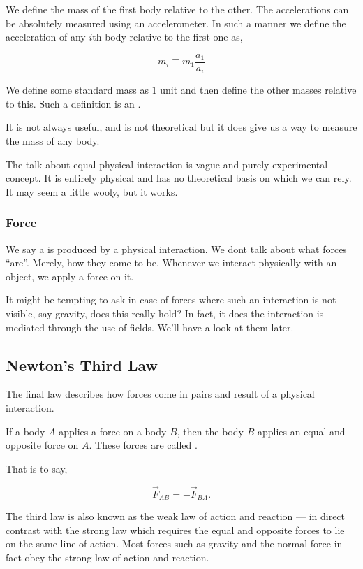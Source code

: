 We define the mass of the first body relative to the other. The accelerations
can be absolutely measured using an accelerometer. In such a manner we define 
the acceleration of any \(i\)th body relative to the first one as, 

\[m_i \equiv m_1\frac{a_1}{a_i}\]

We define some standard mass as \(1\) unit and then define the other masses 
relative to this. Such a definition is an .

It is not always useful, and is not theoretical but it does give us a way to measure the mass
of any body. 

The talk about equal physical interaction is vague and purely experimental concept.
It is entirely physical and has no theoretical basis on which we can rely. It
may seem a little wooly, but it works.

\subsubsection{Force}

We say a  is produced by a physical interaction. We dont 
talk about what forces ``are''. Merely, how they come to be. Whenever 
we interact physically with an object, we apply a force on it.  

It might be tempting to ask in case of forces where such an interaction 
is not visible, say gravity, does this really hold? In fact, it does
the interaction is mediated through the use of fields. We'll have 
a look at them later.

\subsection{Newton's Third Law}

The final law describes how forces come in pairs and result of a physical interaction.

\begin{axioms}
     If a body \(A\) applies a force on a body \(B\), then the body 
    \(B\) applies an equal and opposite force on \(A\). These forces are 
    called .
\end{axioms}

That is to say, 

\[\Vec{F}_{AB} = - \Vec{F}_{BA}.\]

The third law is also known as the weak law of action and reaction ---
in direct contrast with the strong law which requires the equal and opposite
forces to lie on the same line of action. Most forces such as gravity and the
normal force in fact obey the strong law of action and reaction.

